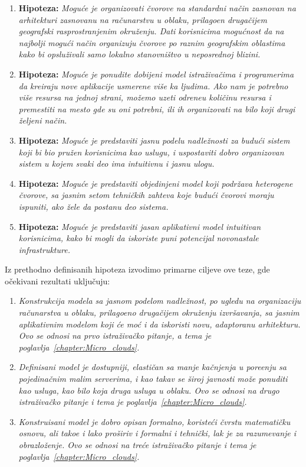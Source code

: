 \begin{enumerate}[start=1,label={(\bfseries \arabic*)}]
	\item \textbf{Hipoteza:} \textit{Mogu\'ce je organizovati \v cvorove na standardni na\v cin zasnovan na arhitekturi zasnovanu na ra\v cunarstvu u oblaku, prilago\dj en druga\v cijem geografski rasprostranjenim okruženju. Dati korisnicima mogu\'cnost da na najbolji mogu\'ci na\v cin organizuju \v cvorove po raznim geografskim oblastima kako bi opslu\v zivali samo lokalno stanovni\v stvo u neposrednoj blizini.}
	\item \textbf{Hipoteza:} \textit{Mogu\'ce je ponudite dobijeni model istra\v ziva\v cima i programerima da kreiraju nove aplikacije usmerene vi\v se ka ljudima. Ako nam je potrebno vi\v se resursa na jednoj strani, mo\v zemo uzeti odre\dj neu koli\v cinu resursa i premestiti na mesto gde su oni potrebni, ili ih organizovati na bilo koji drugi \v zeljeni na\v cin.}
	\item \textbf{Hipoteza:} \textit{Mogu\'ce je predstaviti jasnu podelu nadle\v znosti za budu\'ci sistem koji bi bio pru\v zen korisnicima kao uslugu, i uspostaviti dobro organizovan sistem u kojem svaki deo ima intuitivnu i jasnu ulogu.}
	\item \textbf{Hipoteza:} \textit{Mogu\'ce je predstaviti objedinjeni model koji podr\v zava heterogene \v cvorove, sa jasnim setom tehni\v ckih zahteva koje budu\'ci \v cvorovi moraju ispuniti, ako \v zele da postanu deo sistema.}
	\item \textbf{Hipoteza:} \textit{Mogu\'ce je predstaviti jasan aplikativni model intuitivan korisnicima, kako bi mogli da iskoriste puni potencijal novonastale infrastrukture.}
\end{enumerate}

Iz prethodno definisanih hipoteza izvodimo primarne ciljeve ove teze, gde o\v cekivani rezultati uklju\v cuju:

\begin{enumerate}[start=1,label={(\bfseries \arabic*)}]
	\item \textit{Konstrukcija modela sa jasnom podelom nadle\v znost, po ugledu na organizaciju ra\v cunarstva u oblaku, prilago\dj eno druga\v cijem okru\v zenju izvr\v savanja, sa jasnim aplikativnim modelom koji \'ce mo\'c i da iskoristi novu, adaptoranu arhitekturu. Ovo se odnosi na prvo istra\v ziva\v cko pitanje, a tema je poglavlja~\ref{chapter:Micro_clouds}.}
	\item \textit{Definisani model je dostupniji, elasti\v can sa manje ka\v cnjenja u pore\dj enju sa pojedina\v cnim malim serverima, i kao takav se \v siroj javnosti mo\v ze ponuditi kao usluga, kao bilo koja druga usluga u oblaku. Ovo se odnosi na drugo istra\v ziva\v cko pitanje i tema je poglavlja~\ref{chapter:Micro_clouds}.}
	\item \textit{Konstruisani model je dobro opisan formalno, koriste\'ci \v cvrstu matemati\v cku osnovu, ali tako\dj e i lako pro\v siriv i formalni i tehni\v cki, lak je za razumevanje i obrazlo\v zenje. Ovo se odnosi na tre\'ce istra\v ziva\v cko pitanje i tema je poglavlja~\ref{chapter:Micro_clouds}.}
\end{enumerate}


